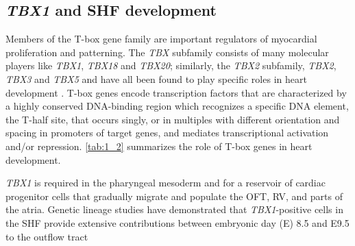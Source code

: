 \begin{refsection}
\section{\textit{TBX1} and SHF development}


Members of the T-box gene family are important regulators of myocardial proliferation and patterning. The \textit{TBX} subfamily consists of many molecular players like \textit{TBX1}, \textit{TBX18} and \textit{TBX20}; similarly, the \textit{TBX2} subfamily, \textit{TBX2}, \textit{TBX3} and \textit{TBX5} and have all been found to play specific roles in heart development \cite{naiche2005t,plageman2005t,stennard2005t,merscher2001tbx1}. T-box genes encode transcription factors that are characterized by a highly conserved DNA-binding region which recognizes a specific DNA element, the T-half site, that occurs singly, or in multiples with different orientation and spacing in promoters of target genes, and mediates transcriptional activation and/or repression. \cref{tab:1_2} summarizes the role of T-box genes in heart development.

\textit{TBX1} is required in the pharyngeal mesoderm \cite{naiche2005t} and for a reservoir of cardiac progenitor cells that gradually migrate and populate the OFT, RV, and parts of the atria. Genetic lineage studies have demonstrated that \textit{TBX1}-positive cells in the SHF provide extensive contributions between embryonic day (E) 8.5 and E9.5 to the outflow tract


\end{refsection}
